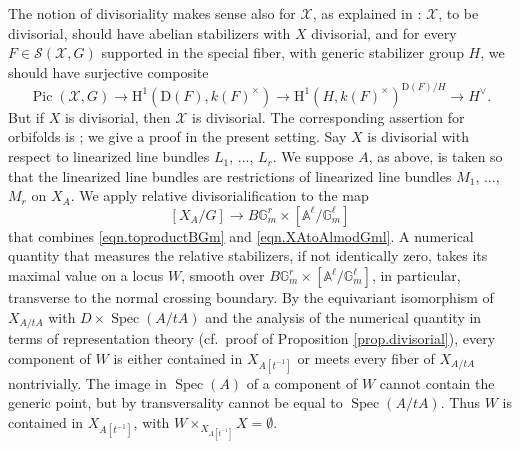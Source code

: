 \documentclass[12pt,reqno]{amsart}
\theoremstyle{plain}
\theoremstyle{remark}
\theoremstyle{definition}
\numberwithin{equation}{section}
\newcommand{\A}{{\mathbb A}}
\newcommand{\G}{{\mathbb G}}
\newcommand{\cX}{{\mathcal X}}
\newcommand{\rH}{{\mathrm H}}
\DeclareMathOperator{\Pic}{Pic}
\DeclareMathOperator{\Spec}{Spec}
\begin{document}
The notion of divisoriality makes sense also for $\cX$, as explained in \cite[Sect.\ 6]{BnG}: $\cX$, to be divisorial, should have abelian stabilizers with $X$ divisorial, and for every $F\in \mathcal{S}(\cX,G)$ supported in the special fiber, with generic stabilizer group $H$, we should have surjective composite
\[
\Pic(\cX,G)\to 
\rH^1(\mathrm{D}(F), k(F)^\times)
\to \rH^1(H, k(F)^\times)^{\mathrm{D}(F)/H} \to H^\vee.
\]
But if $X$ is divisorial, then $\cX$ is divisorial.
The corresponding assertion for orbifolds is \cite[Lemma 9.1(ii)]{KT-stacks}; we give a proof in the present setting.
Say $X$ is divisorial with respect to linearized line bundles $L_1$, $\dots$, $L_r$.
We suppose $A$, as above, is taken so that the linearized line bundles are restrictions of linearized line bundles $M_1$, $\dots$, $M_r$ on $X_A$.
We apply relative divisorialification
to the map
\[
[X_A/G]\to B\G_m^r\times [\A^\ell/\G_m^\ell]
\]
that combines \eqref{eqn.toproductBGm} and \eqref{eqn.XAtoAlmodGml}.
A numerical quantity that measures the
relative stabilizers, if not identically zero, takes its maximal value on a locus $W$, smooth over $B\G_m^r\times [\A^\ell/\G_m^\ell]$, in particular, transverse to the normal crossing boundary.
By the equivariant isomorphism of
$X_{A/tA}$ with $D\times \Spec(A/tA)$ and the analysis of the numerical quantity in terms of representation theory (cf.\  proof of Proposition \ref{prop.divisorial}),
every component of $W$ is either contained in $X_{A[t^{-1}]}$ or meets every fiber of $X_{A/tA}$ nontrivially.
The image in $\Spec(A)$ of a component of $W$ cannot contain the generic point, but by transversality cannot be equal to $\Spec(A/tA)$.
Thus $W$ is contained in $X_{A[t^{-1}]}$, with $W\times_{X_{A[t^{-1}]}}X=\emptyset$.
\end{document}
